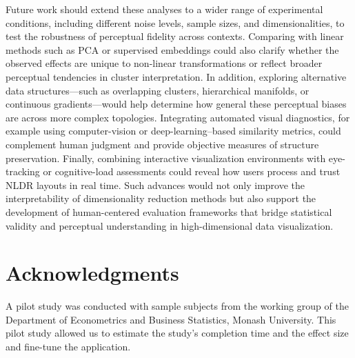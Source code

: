 \documentclass[
  11pt,
  a4paper,
]{report}
\begin{document}
Future work should extend these analyses to a wider range of
experimental conditions, including different noise levels, sample sizes,
and dimensionalities, to test the robustness of perceptual fidelity
across contexts. Comparing with linear methods such as PCA or supervised
embeddings could also clarify whether the observed effects are unique to
non-linear transformations or reflect broader perceptual tendencies in
cluster interpretation. In addition, exploring alternative data
structures---such as overlapping clusters, hierarchical manifolds, or
continuous gradients---would help determine how general these perceptual
biases are across more complex topologies. Integrating automated visual
diagnostics, for example using computer-vision or deep-learning--based
similarity metrics, could complement human judgment and provide
objective measures of structure preservation. Finally, combining
interactive visualization environments with eye-tracking or
cognitive-load assessments could reveal how users process and trust NLDR
layouts in real time. Such advances would not only improve the
interpretability of dimensionality reduction methods but also support
the development of human-centered evaluation frameworks that bridge
statistical validity and perceptual understanding in high-dimensional
data visualization.

\section{Acknowledgments}\label{acknowledgments-1}

A pilot study was conducted with sample subjects from the working group
of the Department of Econometrics and Business Statistics, Monash
University. This pilot study allowed us to estimate the study's
completion time and the effect size and fine-tune the application.
\end{document}
